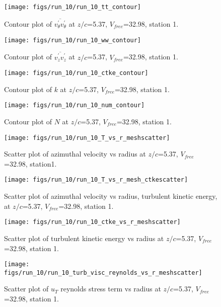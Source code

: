 \begin{figure}[H]
\centering
\texttt{[image: figs/run\_10/run\_10\_tt\_contour]}
\caption{Contour plot of $\overline{v_{\theta}^{\prime} v_{\theta}^{\prime}}$ at $z/c$=5.37, $V_{free}$=32.98, station 1.}
\end{figure}


\begin{figure}[H]
\centering
\texttt{[image: figs/run\_10/run\_10\_ww\_contour]}
\caption{Contour plot of $\overline{v_{z}^{\prime} v_{z}^{\prime}}$ at $z/c$=5.37, $V_{free}$=32.98, station 1.}
\end{figure}


\begin{figure}[H]
\centering
\texttt{[image: figs/run\_10/run\_10\_ctke\_contour]}
\caption{Contour plot of $k$ at $z/c$=5.37, $V_{free}$=32.98, station 1.}
\end{figure}


\begin{figure}[H]
\centering
\texttt{[image: figs/run\_10/run\_10\_num\_contour]}
\caption{Contour plot of $N$ at $z/c$=5.37, $V_{free}$=32.98, station 1.}
\end{figure}


\begin{figure}[H]
\centering
\texttt{[image: figs/run\_10/run\_10\_T\_vs\_r\_meshscatter]}
\caption{Scatter plot of azimuthal velocity vs radius at $z/c$=5.37, $V_{free}$=32.98, station1.}
\end{figure}


\begin{figure}[H]
\centering
\texttt{[image: figs/run\_10/run\_10\_T\_vs\_r\_mesh\_ctkescatter]}
\caption{Scatter plot of azimuthal velocity vs radius, turbulent kinetic energy, at $z/c$=5.37, $V_{free}$=32.98, station 1.}
\end{figure}


\begin{figure}[H]
\centering
\texttt{[image: figs/run\_10/run\_10\_ctke\_vs\_r\_meshscatter]}
\caption{Scatter plot of turbulent kinetic energy vs radius at $z/c$=5.37, $V_{free}$=32.98, station 1.}
\end{figure}


\begin{figure}[H]
\centering
\texttt{[image: figs/run\_10/run\_10\_turb\_visc\_reynolds\_vs\_r\_meshscatter]}
\caption{Scatter plot of $
u_T$ reynolds stress term vs radius at $z/c$=5.37, $V_{free}$=32.98, station 1.}
\end{figure}


